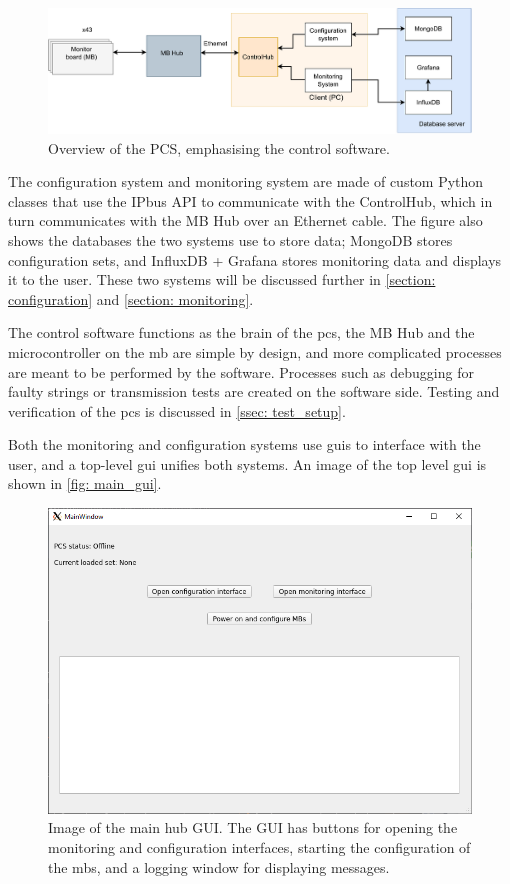 \documentclass[main.tex]{subfiles}
\begin{document}
\begin{figure}[!htpb]
    \centering
    \includegraphics[width=15cm]{images/PCS_dust.pdf}
    \caption{Overview of the PCS, emphasising the control software.}
    \label{fig: software_overview}
\end{figure}
\FloatBarrier


The configuration system and monitoring system are made of custom Python classes that use the IPbus API to communicate with the ControlHub, which in turn communicates with the MB Hub over an Ethernet cable. The figure also shows the databases the two systems use to store data; MongoDB stores configuration sets, and InfluxDB + Grafana stores monitoring data and displays it to the user. These two systems will be discussed further in \autoref{section: configuration} and \autoref{section: monitoring}.

The control software functions as the brain of the \gls{pcs}, the MB Hub and the microcontroller on the \gls{mb} are simple by design, and more complicated processes are meant to be performed by the software. Processes such as debugging for faulty strings or transmission tests are created on the software side. Testing and verification of the \gls{pcs} is discussed in \autoref{ssec: test_setup}.
 
Both the monitoring and configuration systems use \gls{gui}s to interface with the user, and a top-level \gls{gui} unifies both systems. An image of the top level \gls{gui} is shown in \autoref{fig: main_gui}.


\begin{figure}[!ht]
    \centering
    \includegraphics[scale=0.65]{images/main_gui.png}
    \caption{Image of the main hub GUI. The GUI has buttons for opening the monitoring and configuration interfaces, starting the configuration of the \gls{mb}s, and a logging window for displaying messages.}
    \label{fig: main_gui}
\end{figure}
\end{document}
